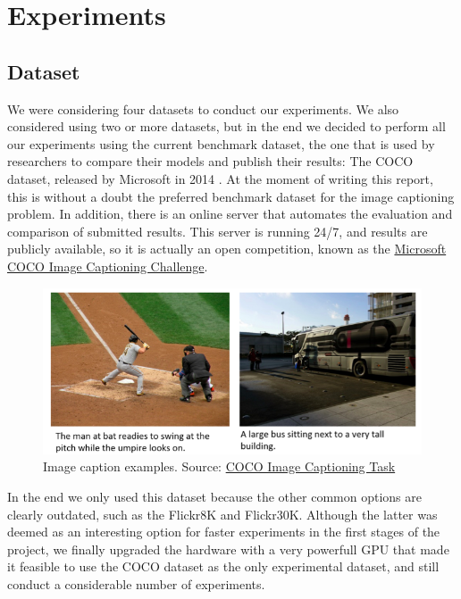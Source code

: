 \chapter{Experiments}
\label{ch:experiments}

\section{Dataset}

We were considering four datasets to conduct our experiments. We also considered using two or more datasets, but in the end we decided to perform all our experiments using the current benchmark dataset, the one that is used by researchers to compare their models and publish their results: The COCO dataset, released by Microsoft in 2014  \citet{Lin2014}. At the moment of writing this report, this is without a doubt the preferred benchmark dataset for the image captioning problem. In addition, there is an online server that automates the evaluation and comparison of submitted results. This server is running 24/7, and results are publicly available, so it is actually an open competition, known as the \href{https://competitions.codalab.org/competitions/3221}{Microsoft COCO Image Captioning Challenge}. 

\begin{figure}[hpt]
	\centering
	\includegraphics[scale=0.5]{images/ch5/captions-splash.jpg}
	\caption{Image caption examples. Source: \href{http://cocodataset.org/}{COCO Image Captioning Task}}
	\label{fig:caption-example}
\end{figure}

In the end we only used this dataset because the other common options are clearly outdated, such as the Flickr8K and Flickr30K. Although the latter was deemed as an interesting option for faster experiments in the first stages of the project, we finally upgraded the hardware with a very powerfull GPU that made it feasible to use the COCO dataset as the only experimental dataset, and still conduct a considerable number of experiments.


